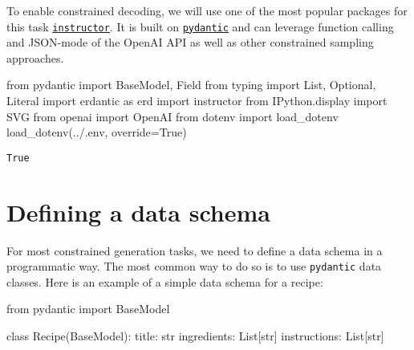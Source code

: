 \documentclass[
  letterpaper,
  DIV=11,
  numbers=noendperiod]{scrreprt}
\newenvironment{Shaded}{\begin{snugshade}}{\end{snugshade}}
\newcommand{\BuiltInTok}[1]{\textcolor[rgb]{0.00,0.23,0.31}{#1}}
\newcommand{\ImportTok}[1]{\textcolor[rgb]{0.00,0.46,0.62}{#1}}
\newcommand{\KeywordTok}[1]{\textcolor[rgb]{0.00,0.23,0.31}{#1}}
\newcommand{\NormalTok}[1]{\textcolor[rgb]{0.00,0.23,0.31}{#1}}
\newcommand{\OperatorTok}[1]{\textcolor[rgb]{0.37,0.37,0.37}{#1}}
\newcommand{\StringTok}[1]{\textcolor[rgb]{0.13,0.47,0.30}{#1}}
\newcommand{\VariableTok}[1]{\textcolor[rgb]{0.07,0.07,0.07}{#1}}
\begin{document}
To enable constrained decoding, we will use one of the most popular
packages for this task
\href{https://jxnl.github.io/instructor/}{\texttt{instructor}}. It is
built on \href{}{\texttt{pydantic}} and can leverage function calling
and JSON-mode of the OpenAI API as well as other constrained sampling
approaches.

\begin{Shaded}
\begin{Highlighting}[]
\ImportTok{from}\NormalTok{ pydantic }\ImportTok{import}\NormalTok{ BaseModel, Field}
\ImportTok{from}\NormalTok{ typing }\ImportTok{import}\NormalTok{ List, Optional, Literal}
\ImportTok{import}\NormalTok{ erdantic }\ImportTok{as}\NormalTok{ erd}
\ImportTok{import}\NormalTok{ instructor}
\ImportTok{from}\NormalTok{ IPython.display }\ImportTok{import}\NormalTok{ SVG}
\ImportTok{from}\NormalTok{ openai }\ImportTok{import}\NormalTok{ OpenAI}
\ImportTok{from}\NormalTok{ dotenv }\ImportTok{import}\NormalTok{ load\_dotenv}
\NormalTok{load\_dotenv(}\StringTok{\textquotesingle{}../.env\textquotesingle{}}\NormalTok{, override}\OperatorTok{=}\VariableTok{True}\NormalTok{)}
\end{Highlighting}
\end{Shaded}

\begin{verbatim}
True
\end{verbatim}

\hypertarget{defining-a-data-schema}{%
\section{Defining a data schema}\label{defining-a-data-schema}}

For most constrained generation tasks, we need to define a data schema
in a programmatic way. The most common way to do so is to use
\texttt{pydantic} data classes. Here is an example of a simple data
schema for a recipe:

\begin{Shaded}
\begin{Highlighting}[]
\ImportTok{from}\NormalTok{ pydantic }\ImportTok{import}\NormalTok{ BaseModel}

\KeywordTok{class}\NormalTok{ Recipe(BaseModel):}
\NormalTok{    title: }\BuiltInTok{str}
\NormalTok{    ingredients: List[}\BuiltInTok{str}\NormalTok{]}
\NormalTok{    instructions: List[}\BuiltInTok{str}\NormalTok{]}
\end{Highlighting}
\end{Shaded}
\end{document}
